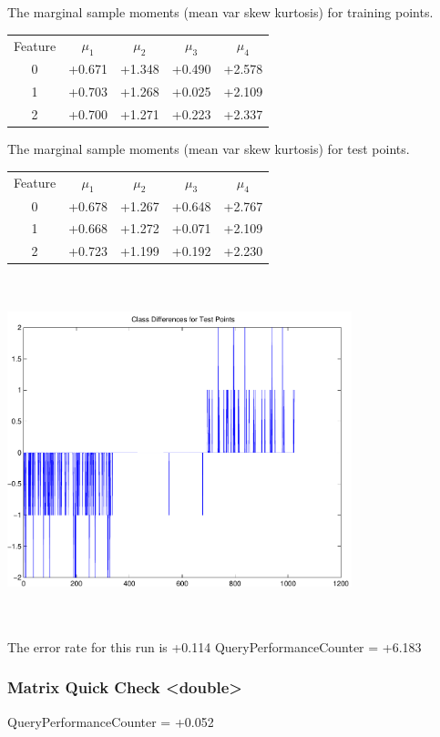 \documentclass[9pt]{article}
\theoremstyle{plain}
\theoremstyle{definition}
\theoremstyle{remark}
\numberwithin{equation}{section}
\begin{document}
The marginal sample moments (mean var skew kurtosis) for training points.\newline
\begin{tabular}{ c |  c  c  c  c}
Feature & $\mu_1$ & $\mu_2$ & $\mu_3$ & $\mu_4$ \\
0 & +0.671 & +1.348 & +0.490& +2.578 \\
\hline
1 & +0.703 & +1.268 & +0.025& +2.109 \\
\hline
2 & +0.700 & +1.271 & +0.223& +2.337 \\
\hline
\end{tabular}
\newline
The marginal sample moments (mean var skew kurtosis) for test points.\newline
\begin{tabular}{ c | c  c  c  c}
Feature & $\mu_1$ & $\mu_2$ & $\mu_3$ & $\mu_4$ \\
0 & +0.678 & +1.267 & +0.648& +2.767\\
\hline
1 & +0.668 & +1.272 & +0.071& +2.109\\
\hline
2 & +0.723 & +1.199 & +0.192& +2.230\\
\hline
\end{tabular}\newline
\includegraphics[width=10.0cm,height=10.0cm]{classDiffs.pdf}

The error rate for this run is +0.114\newline
QueryPerformanceCounter  =  +6.183
\subsubsection{Matrix Quick Check <double>}
QueryPerformanceCounter  =  +0.052
\end{document}
